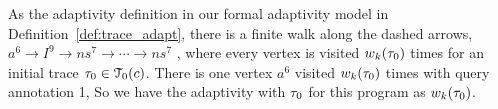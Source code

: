 \begin{example}
As the adaptivity definition in our formal adaptivity model in Definition~\ref{def:trace_adapt},
there is a finite walk along the dashed arrows,
$a^{6} \to I^9 \to ns^{7} \to  \cdots \to ns^7$ , 
where every vertex is visited $w_k(\mathtt{\tau}_0)$ times for an initial trace $\mathtt{\tau}_0 \in \mathcal{T}_0(c)$.
There is one vertex $a^{6}$ visited $w_k(\mathtt{\tau}_0)$ times with query annotation 1, 
So we have the adaptivity with $\mathtt{\tau}_0$ for this program as $w_k(\mathtt{\tau}_0)$.


\end{example}

